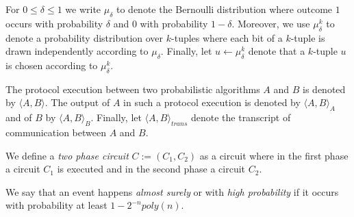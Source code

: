 \noindent
For $0 \leq \delta \leq 1$ we write $\mu_{\delta}$ to denote the Bernoulli distribution where outcome $1$ occurs with
probability $\delta$ and $0$ with probability $1-\delta$.
Moreover, we use $\mu_{\delta}^k$ to denote a probability distribution over $k$-tuples
where each bit of a $k$-tuple is drawn independently according to $\mu_{\delta}$.
Finally, let $u \leftarrow \mu_{\delta}^k$ denote that a $k$-tuple $u$ is chosen according to $\mu_{\delta}^k$.

The protocol execution between two probabilistic algorithms $A$ and $B$ is denoted by $\langle A, B \rangle$.
The output of $A$ in such a protocol execution is denoted by $\langle A, B \rangle_A$ and of $B$ by $\langle A, B \rangle_B$.
Finally, let $\langle A, B \rangle_{\mathit{trans}}$ denote the transcript of communication between $A$ and $B$.

We define a \textit{two phase circuit} $C := (C_1, C_2)$ as a circuit where in the first phase a circuit $C_1$
is executed and in the second phase a circuit $C_2$.

We say that an event happens \textit{almost surely} or with \textit{high probability} if
it occurs with probability at least $1 - 2^{-n} \mathit{poly}(n)$.

